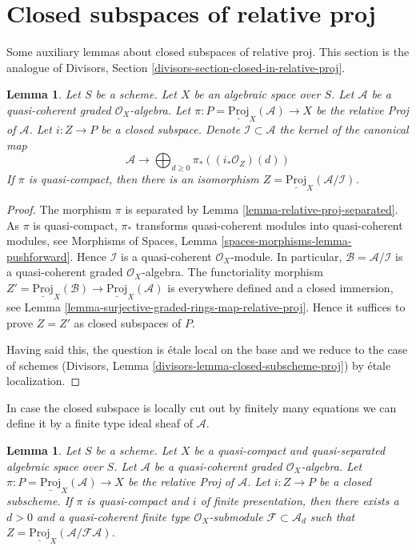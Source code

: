 \documentclass{stacks-project}
\theoremstyle{plain}
\newtheorem{lemma}[subsection]{Lemma}
\theoremstyle{definition}
\theoremstyle{remark}
\numberwithin{equation}{subsection}
\begin{document}
\section{Closed subspaces of relative proj}
\label{section-closed-in-relative-proj}

\noindent
Some auxiliary lemmas about closed subspaces of relative proj.
This section is the analogue of
Divisors, Section \ref{divisors-section-closed-in-relative-proj}.

\begin{lemma}
\label{lemma-closed-subscheme-proj}
Let $S$ be a scheme. Let $X$ be an algebraic space over $S$.
Let $\mathcal{A}$ be a quasi-coherent graded $\mathcal{O}_X$-algebra. Let
$\pi : P = \underline{\text{Proj}}_X(\mathcal{A}) \to X$ be the relative
Proj of $\mathcal{A}$. Let $i : Z \to P$ be a closed subspace. Denote
$\mathcal{I} \subset \mathcal{A}$ the kernel of the canonical map
$$
\mathcal{A}
\longrightarrow
\bigoplus\nolimits_{d \geq 0} \pi_*\left((i_*\mathcal{O}_Z)(d)\right)
$$
If $\pi$ is quasi-compact, then there is an isomorphism
$Z = \underline{\text{Proj}}_X(\mathcal{A}/\mathcal{I})$.
\end{lemma}

\begin{proof}
The morphism $\pi$ is separated by
Lemma \ref{lemma-relative-proj-separated}.
As $\pi$ is quasi-compact, $\pi_*$ transforms quasi-coherent modules
into quasi-coherent modules, see
Morphisms of Spaces, Lemma \ref{spaces-morphisms-lemma-pushforward}.
Hence $\mathcal{I}$ is a quasi-coherent $\mathcal{O}_X$-module.
In particular, $\mathcal{B} = \mathcal{A}/\mathcal{I}$ is a
quasi-coherent graded $\mathcal{O}_X$-algebra. The functoriality
morphism $Z' = \underline{\text{Proj}}_X(\mathcal{B}) \to
\underline{\text{Proj}}_X(\mathcal{A})$ is everywhere defined and
a closed immersion, see Lemma
\ref{lemma-surjective-graded-rings-map-relative-proj}.
Hence it suffices to prove $Z = Z'$ as closed subspaces of $P$.

\medskip\noindent
Having said this, the question is \'etale local on the base and we
reduce to the case of schemes
(Divisors, Lemma \ref{divisors-lemma-closed-subscheme-proj})
by \'etale localization.
\end{proof}

\noindent
In case the closed subspace is locally cut out by finitely many
equations we can define it by a finite type ideal sheaf of
$\mathcal{A}$.

\begin{lemma}
\label{lemma-closed-subscheme-proj-finite}
Let $S$ be a scheme. Let $X$ be a quasi-compact and quasi-separated
algebraic space over $S$.
Let $\mathcal{A}$ be a quasi-coherent graded $\mathcal{O}_X$-algebra. Let
$\pi : P = \underline{\text{Proj}}_X(\mathcal{A}) \to X$ be the relative
Proj of $\mathcal{A}$. Let $i : Z \to P$ be a closed subscheme.
If $\pi$ is quasi-compact and $i$ of finite presentation, then there exists
a $d > 0$ and a quasi-coherent finite type $\mathcal{O}_X$-submodule
$\mathcal{F} \subset \mathcal{A}_d$ such that
$Z = \underline{\text{Proj}}_X(\mathcal{A}/\mathcal{F}\mathcal{A})$.
\end{lemma}
\end{document}
